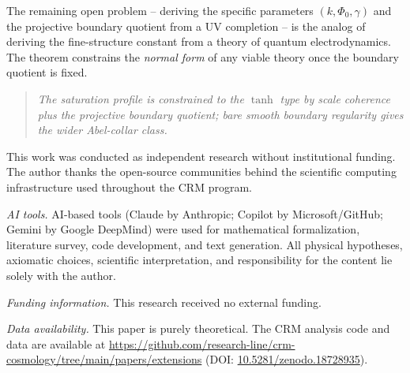 \documentclass[aps,prd,twocolumn,superscriptaddress,nofootinbib]{revtex4-2}
\begin{document}
The remaining open problem -- deriving the specific parameters $(k, \Phi_0, \gamma)$ and the projective boundary quotient from a UV completion -- is the analog of deriving the fine-structure constant from a theory of quantum electrodynamics. The theorem constrains the \textit{normal form} of any viable theory once the boundary quotient is fixed.

\begin{quote}
\textit{The saturation profile is constrained to the $\tanh$ type by scale coherence plus the projective boundary quotient; bare smooth boundary regularity gives the wider Abel-collar class.}
\end{quote}


\begin{acknowledgments}
This work was conducted as independent research without institutional funding. The author thanks the open-source communities behind the scientific computing infrastructure used throughout the CRM program.

\textit{AI tools.} AI-based tools (Claude by Anthropic; Copilot by Microsoft/GitHub; Gemini by Google DeepMind) were used for mathematical formalization, literature survey, code development, and text generation. All physical hypotheses, axiomatic choices, scientific interpretation, and responsibility for the content lie solely with the author.

\textit{Funding information.} This research received no external funding.

\textit{Data availability.} This paper is purely theoretical. The CRM analysis code and data are available at \url{https://github.com/research-line/crm-cosmology/tree/main/papers/extensions} (DOI: \href{https://doi.org/10.5281/zenodo.18728935}{10.5281/zenodo.18728935}).
\end{acknowledgments}
\end{document}
